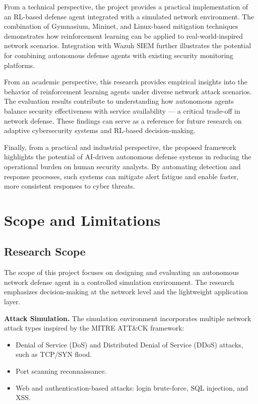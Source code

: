 \documentclass[12pt,a4paper]{report}
\begin{document}
From a technical perspective, the project provides a practical implementation of an RL-based defense agent integrated with a simulated network environment. The combination of Gymnasium, Mininet, and Linux-based mitigation techniques demonstrates how reinforcement learning can be applied to real-world-inspired network scenarios. Integration with Wazuh SIEM further illustrates the potential for combining autonomous defense agents with existing security monitoring platforms.

From an academic perspective, this research provides empirical insights into the behavior of reinforcement learning agents under diverse network attack scenarios. The evaluation results contribute to understanding how autonomous agents balance security effectiveness with service availability — a critical trade-off in network defense. These findings can serve as a reference for future research on adaptive cybersecurity systems and RL-based decision-making.

Finally, from a practical and industrial perspective, the proposed framework highlights the potential of AI-driven autonomous defense systems in reducing the operational burden on human security analysts. By automating detection and response processes, such systems can mitigate alert fatigue and enable faster, more consistent responses to cyber threats.

\section{Scope and Limitations}

\subsection{Research Scope}

The scope of this project focuses on designing and evaluating an autonomous network defense agent in a controlled simulation environment. The research emphasizes decision-making at the network level and the lightweight application layer.

\textbf{Attack Simulation.} The simulation environment incorporates multiple network attack types inspired by the MITRE ATT\&CK framework:
\begin{itemize}
  \item Denial of Service (DoS) and Distributed Denial of Service (DDoS) attacks, such as TCP/SYN flood.
  \item Port scanning reconnaissance.
  \item Web and authentication-based attacks: login brute-force, SQL injection, and XSS.
\end{itemize}
\end{document}
